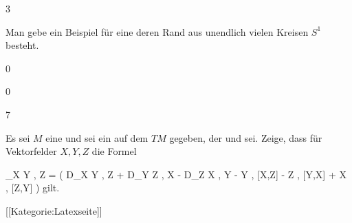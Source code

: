 {3}
{

Man gebe ein Beispiel für eine
deren Rand aus
 {} {}
unendlich vielen Kreisen $S^1$ besteht.

}
{} {}

{0}
{

}
{} {}

{0}
{

}
{} {}

{7}
{

Es sei $M$ eine
und sei ein
auf dem
$TM$ gegeben, der
und
sei. Zeige, dass für Vektorfelder $X,Y,Z$ die Formel

\mavergleichskettedisp
{\vergleichskette
{ \left\langle \nabla_X Y , Z  \right\rangle
}
{ =} { {  }  \left(  D_X \left\langle  Y  ,  Z  \right\rangle +  D_Y \left\langle  Z  ,  X  \right\rangle -  D_Z \left\langle  X  ,  Y  \right\rangle  - \left\langle  Y  , [X,Z]   \right\rangle - \left\langle  Z  , [Y,X]   \right\rangle + \left\langle  X  , [Z,Y]   \right\rangle   \right)
}
{ } {
}
{ } {
}
{ } {
}
}
{}{}{}
gilt.

}
{} {}

 [[Kategorie:Latexseite]]
